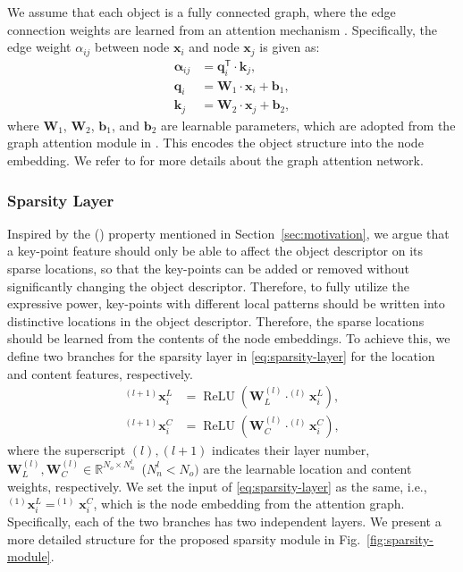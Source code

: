 \documentclass[letterpaper, 10 pt, journal, twoside]{IEEEtran}  %
\newcommand{\rom}[1]{\uppercase\expandafter{\romannumeral #1\relax}}
\newcommand{\fref}[1]{Fig.~\ref{#1}}
\newcommand{\sref}[1]{Section~\ref{#1}}
\newcommand{\ie}{{i.e.},~}
\begin{document}
{We assume that each object is a fully connected graph, where the edge connection weights are learned from an attention mechanism \cite{vaswani2017attention}. Specifically, the edge weight $\alpha_{ij}$ between node $\mathbf{x}_i$ and node $\mathbf{x}_j$ is given as:
\begin{subequations}\label{eq:graph_edg_q}
    \begin{align}\label{eq:graph_edg_k}
        \mathbf{\alpha}_{ij} &= \mathbf{q}_i^\mathsf{T} \cdot \mathbf{k}_j,\\
        \mathbf{q}_i &=\mathbf{W}_1 \cdot \mathbf{x}_i + \mathbf{b}_1,\\
        \mathbf{k}_j &=\mathbf{W}_2 \cdot \mathbf{x}_j + \mathbf{b}_2,
    \end{align}
\end{subequations}
where $\mathbf{W}_1$, $\mathbf{W}_2$, $\mathbf{b}_1$, and $\mathbf{b}_2$ are learnable parameters, which are adopted from the graph attention module in \cite{sarlin2020superglue}.
This encodes the object structure into the node embedding.
We refer to \cite{velickovic2018graph} for more details about the graph attention network.

}

\subsubsection{Sparsity Layer} \label{sec:sparsity}
Inspired by the (\rom{2}) property mentioned in \sref{sec:motivation}, we argue that a key-point feature should only be able to affect the object descriptor on its sparse locations, so that the key-points can be added or removed without significantly changing the object descriptor.
Therefore, to fully utilize the expressive power, key-points with different local patterns should be written into distinctive locations in the object descriptor.
Therefore, the sparse locations should be learned from the contents of the node embeddings. To achieve this, we define two branches for the sparsity layer in \eqref{eq:sparsity-layer} for the location and content features, respectively.
\begin{subequations}\label{eq:sparsity-layer}
    \begin{align}\label{eq:location-feature}
        ^{(l+1)}\mathbf{x}_i^L & = \operatorname{ReLU} (\mathbf{W}_L^{(l)} \cdot ^{(l)}\mathbf{x}_i^L),\\
        ^{(l+1)}\mathbf{x}_i^C & = \operatorname{ReLU} (\mathbf{W}_C^{(l)} \cdot ^{(l)}\mathbf{x}_i^C),
    \end{align}
\end{subequations}
where the superscript $(l), (l+1)$ indicates their layer number, $\mathbf{W}_L^{(l)},\mathbf{W}_C^{(l)}\in \mathbb{R}^{N_o \times N_n^{l}}$~($N_n^{l} < N_o)$  are the learnable location and content weights, respectively.
We set the input of \eqref{eq:sparsity-layer} as the same, \ie
$^{(1)}\mathbf{x}_i^L=^{(1)}\mathbf{x}_i^C$, which is the node embedding from the attention graph.
Specifically, each of the two branches has two independent layers. We present a more detailed structure for the proposed sparsity module in \fref{fig:sparsity-module}.
\end{document}
